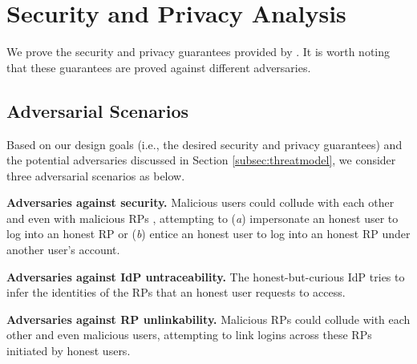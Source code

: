 \section{Security and Privacy Analysis}
\label{sec:analysis}


We prove the security and privacy guarantees provided by \usso.
It is worth noting that these guarantees are proved against different adversaries.


\subsection{Adversarial Scenarios}

Based on our design goals (i.e., the desired security and privacy guarantees) and the potential adversaries discussed in Section \ref{subsec:threatmodel}, we consider three adversarial scenarios as below.

\noindent\textbf{Adversaries against security.} Malicious users could collude with each other and even with malicious RPs \cite{FettKS14,BrowserID,SPRESSO}, attempting to (\emph{a}) impersonate an honest user to log into an honest RP or (\emph{b}) entice an honest user to log into an honest RP under another user's account.

\noindent\textbf{Adversaries against IdP untraceability.}
The honest-but-curious IdP tries to infer the identities of the RPs that an honest user requests to access. %

\noindent\textbf{Adversaries against RP unlinkability.}
Malicious RPs could collude with each other and even malicious users, attempting to link logins across these RPs initiated by honest users. 





